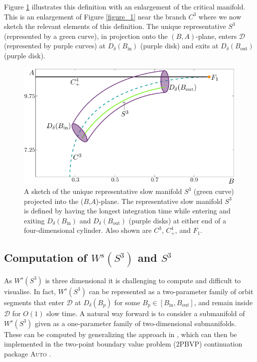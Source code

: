 \documentclass{ws-ijbc}
\begin{document}
Figure \ref{figure_2} illustrates this definition with an enlargement of the critical manifold.  This is an enlargement of Figure \ref{figure_1} near the branch $C^3$ where we now sketch the relevant elements of this definition. The unique representative $S^3$ (represented by a green curve), in projection onto the $(B,A)$-plane, enters $\mathscr{D}$ (represented by purple curves) at $D_\delta(B_{\mathrm{in}})$ (purple disk) and exits at $D_\delta(B_{\mathrm{out}})$ (purple disk).

\begin{figure}[!t]
\begin{center}
\includegraphics{./figures/MKMO_2.pdf}
\end{center}
\caption{A sketch of the unique representative slow manifold $S^3$ (green curve) projected into the ($B$,$A$)-plane.  The representative slow manifold $S^3$ is defined by having the longest integration time while entering and exiting  $D_\delta(B_{\mathrm{in}})$ and $D_\delta(B_{\mathrm{out}})$ (purple disks) at either end of a four-dimensional cylinder.  Also shown are $C^3$, $C^4_+$, and $F_1$.}
\label{figure_2}
\end{figure}

\subsection{Computation of $W^{s}(S^3)$ and  $S^3$}

As $W^{s}(S^3)$ is three dimensional it is challenging to compute and difficult to visualise.  In fact, $W^{s}(S^3)$ can be represented as a two-parameter family of orbit segments that enter $\mathscr{D}$ at $D_{\delta}(B_p)$ for some $B_p \in [B_{\text{in}}, B_{\text{out}}]$, and remain inside $\mathscr{D}$ for $O(1)$ slow time.  A natural way forward is to consider a submanifold of $W^{s}(S^3)$ given as a one-parameter family of two-dimensional submanifolds.  These can be computed by generalizing the approach in \cite{Saeed_Paper}, which can then be implemented in the two-point boundary value problem (2PBVP) continuation package \textsc{Auto} \cite{AUTO}.  
\end{document}
